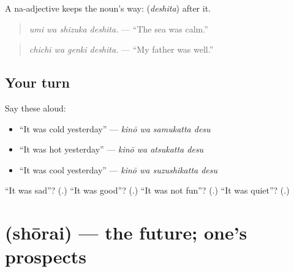 A na-adjective keeps the noun's way: \textbf{} (\emph{deshita}) after it.

\begin{quote}
\textbf{ }
\end{quote}

\begin{quote}
\emph{umi wa shizuka deshita.} — \textquotedblleft{}The sea was calm.\textquotedblright{}
\end{quote}

\begin{quote}
\textbf{ }
\end{quote}

\begin{quote}
\emph{chichi wa genki deshita.} — \textquotedblleft{}My father was well.\textquotedblright{}
\end{quote}

\subsection*{Your turn}
Say these aloud:

\begin{itemize}
\raggedright
  \item \textquotedblleft{}It was cold yesterday\textquotedblright{} — \emph{kinō wa samukatta desu}
  \item \textquotedblleft{}It was hot yesterday\textquotedblright{} — \emph{kinō wa atsukatta desu}
  \item \textquotedblleft{}It was cool yesterday\textquotedblright{} — \emph{kinō wa suzushikatta desu}
\end{itemize}

\begin{tcolorbox}[breakable,colback=teal!4,colframe=teal!35!black,title={Before you move on}]
\textquotedblleft{}It was sad\textquotedblright{}? (\textbf{}.) \textquotedblleft{}It was good\textquotedblright{}? (\textbf{}.) \textquotedblleft{}It was not fun\textquotedblright{}? (\textbf{}.) \textquotedblleft{}It was quiet\textquotedblright{}? (\textbf{}.)
\end{tcolorbox}
\section[\texorpdfstring{\ja{しょうらい} (shōrai)}{しょうらい (shōrai)}]{ (shōrai) — the future; one's prospects}

